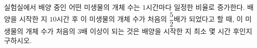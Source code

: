 실험실에서 배양 중인 어떤 미생물의 개체 수는 $1$시간마다 일정한 비율로 증가한다. 배양을 시작한 지 $10$시간 후 이 미생물의 개체 수가 처음의 $\dfrac{5}{2}$배가 되었다고 할 때, 이 미생물의 개체 수가 처음의 $3$배 이상이 되는 것은 배양을 시작한 지 최소 몇 시간 후인지 구하시오. 

